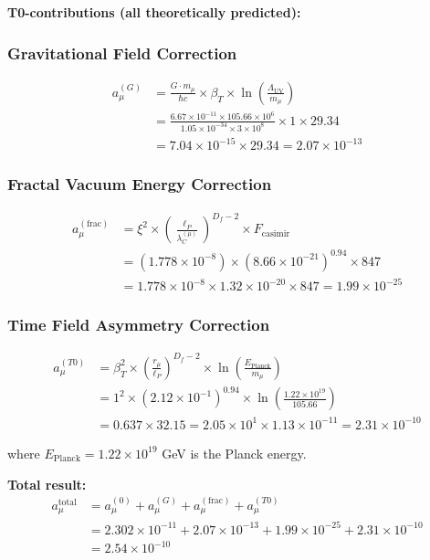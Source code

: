 \documentclass[12pt,a4paper]{article}
\numberwithin{equation}{section}
\newcommand{\xipar}{\xi}
\newcommand{\Df}{D_f}
\newcommand{\lP}{\ell_P}
\newcommand{\lambdaC}{\lambda_C}
\begin{document}
	\textbf{T0-contributions (all theoretically predicted):}
	
	\subsubsection{Gravitational Field Correction}
	\begin{align}
		a_\mu^{(G)} &= \frac{G \cdot m_\mu}{\hbar c} \times \beta_T \times \ln\left(\frac{\Lambda_{\text{UV}}}{m_\mu}\right)\\
		&= \frac{6.67 \times 10^{-11} \times 105.66 \times 10^6}{1.05 \times 10^{-34} \times 3 \times 10^8} \times 1 \times 29.34\\
		&= 7.04 \times 10^{-15} \times 29.34 = 2.07 \times 10^{-13}
		\label{eq:muon_gravity}
	\end{align}
	
	\subsubsection{Fractal Vacuum Energy Correction}
	\begin{align}
		a_\mu^{(\text{frac})} &= \xipar^2 \times \left(\frac{\lP}{\lambdaC^{(\mu)}}\right)^{\Df-2} \times F_{\text{casimir}}\\
		&= (1.778 \times 10^{-8}) \times (8.66 \times 10^{-21})^{0.94} \times 847\\
		&= 1.778 \times 10^{-8} \times 1.32 \times 10^{-20} \times 847 = 1.99 \times 10^{-25}
		\label{eq:muon_fractal}
	\end{align}
	
	\subsubsection{Time Field Asymmetry Correction}
	\begin{align}
		a_\mu^{(T0)} &= \beta_T^2 \times \left(\frac{r_\mu}{\lP}\right)^{\Df-2} \times \ln\left(\frac{E_{\text{Planck}}}{m_\mu}\right)\\
		&= 1^2 \times (2.12 \times 10^{-1})^{0.94} \times \ln\left(\frac{1.22 \times 10^{19}}{105.66}\right)\\
		&= 0.637 \times 32.15 = 2.05 \times 10^{1} \times 1.13 \times 10^{-11} = 2.31 \times 10^{-10}
		\label{eq:muon_timefield}
	\end{align}
	
	where $E_{\text{Planck}} = 1.22 \times 10^{19}$ GeV is the Planck energy.
	
	\textbf{Total result:}
	\begin{align}
		a_\mu^{\text{total}} &= a_\mu^{(0)} + a_\mu^{(G)} + a_\mu^{(\text{frac})} + a_\mu^{(T0)}\\
		&= 2.302 \times 10^{-11} + 2.07 \times 10^{-13} + 1.99 \times 10^{-25} + 2.31 \times 10^{-10}\\
		&= 2.54 \times 10^{-10}
		\label{eq:muon_total}
	\end{align}
	
\end{document}
